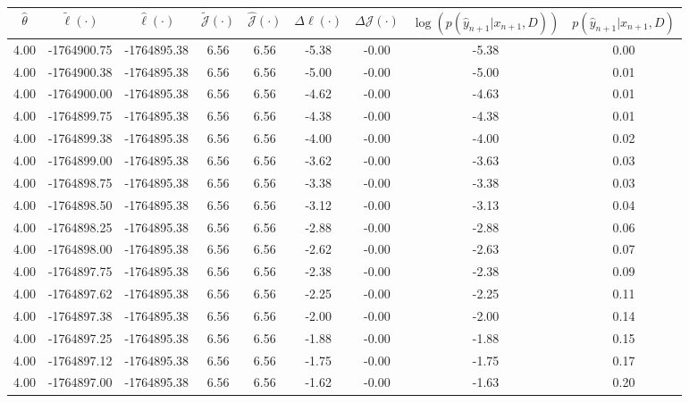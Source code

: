 \begin{table}[htbp]
        \centering
        \tiny
        \begin{adjustbox}{angle=90}
            \begin{tabular}{|c|c|c|c|c|c|c|c|c|}
                \hline
                 $\hat{\theta}$ & $\tilde{\ell}(\cdot)$ & $\hat{\ell}(\cdot)$ & $\tilde{\mathcal{J}}(\cdot)$ & $\hat{\mathcal{J}}(\cdot)$ & $\Delta \ell(\cdot)$ & $\Delta \mathcal{J}(\cdot)$ & $\log(p(\hat{y}_{n+1}|x_{n+1}, D))$ & $p(\hat{y}_{n+1}|x_{n+1}, D)$ \\
                \hline
                 4.00 & -1764900.75 & -1764895.38 & 6.56 & 6.56 & -5.38 & -0.00 & -5.38 & 0.00\\ \hline
 4.00 & -1764900.38 & -1764895.38 & 6.56 & 6.56 & -5.00 & -0.00 & -5.00 & 0.01\\ \hline
 4.00 & -1764900.00 & -1764895.38 & 6.56 & 6.56 & -4.62 & -0.00 & -4.63 & 0.01\\ \hline
 4.00 & -1764899.75 & -1764895.38 & 6.56 & 6.56 & -4.38 & -0.00 & -4.38 & 0.01\\ \hline
 4.00 & -1764899.38 & -1764895.38 & 6.56 & 6.56 & -4.00 & -0.00 & -4.00 & 0.02\\ \hline
 4.00 & -1764899.00 & -1764895.38 & 6.56 & 6.56 & -3.62 & -0.00 & -3.63 & 0.03\\ \hline
 4.00 & -1764898.75 & -1764895.38 & 6.56 & 6.56 & -3.38 & -0.00 & -3.38 & 0.03\\ \hline
 4.00 & -1764898.50 & -1764895.38 & 6.56 & 6.56 & -3.12 & -0.00 & -3.13 & 0.04\\ \hline
 4.00 & -1764898.25 & -1764895.38 & 6.56 & 6.56 & -2.88 & -0.00 & -2.88 & 0.06\\ \hline
 4.00 & -1764898.00 & -1764895.38 & 6.56 & 6.56 & -2.62 & -0.00 & -2.63 & 0.07\\ \hline
 4.00 & -1764897.75 & -1764895.38 & 6.56 & 6.56 & -2.38 & -0.00 & -2.38 & 0.09\\ \hline
 4.00 & -1764897.62 & -1764895.38 & 6.56 & 6.56 & -2.25 & -0.00 & -2.25 & 0.11\\ \hline
 4.00 & -1764897.38 & -1764895.38 & 6.56 & 6.56 & -2.00 & -0.00 & -2.00 & 0.14\\ \hline
 4.00 & -1764897.25 & -1764895.38 & 6.56 & 6.56 & -1.88 & -0.00 & -1.88 & 0.15\\ \hline
 4.00 & -1764897.12 & -1764895.38 & 6.56 & 6.56 & -1.75 & -0.00 & -1.75 & 0.17\\ \hline
 4.00 & -1764897.00 & -1764895.38 & 6.56 & 6.56 & -1.62 & -0.00 & -1.63 & 0.20\\ \hline

\end{tabular}
\end{adjustbox}
\end{table}

